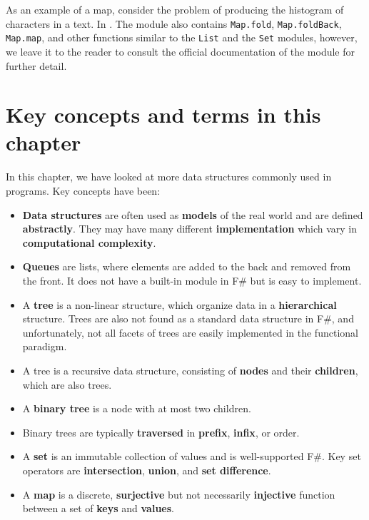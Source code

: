 \documentclass[fsharpNotes.tex]{subfiles}
\begin{document}
As an example of a map, consider the problem of producing the histogram of characters in a text. In .
%
%
The module also contains \lstinline{Map.fold}, \lstinline{Map.foldBack}, \lstinline{Map.map}, and other functions similar to the \lstinline{List} and the \lstinline{Set} modules, however, we leave it to the reader to consult the official documentation of the module for further detail.

\section{Key concepts and terms in this chapter}
In this chapter, we have looked at more data structures commonly used in programs. Key concepts have been:
\begin{itemize}
\item \textbf{Data structures} are often used as \textbf{models} of the real world and are defined \textbf{abstractly}. They may have many different \textbf{implementation} which vary in \textbf{computational complexity}. 
\item \textbf{Queues} are lists, where elements are added to the back and removed from the front. It does not have a built-in module in F\# but is easy to implement.
\item A \textbf{tree} is a non-linear structure, which organize data in a \textbf{hierarchical} structure. Trees are also not found as a standard data structure in F\#, and unfortunately, not all facets of trees are easily implemented in the functional paradigm.
\item A tree is a recursive data structure, consisting of \textbf{nodes} and their \textbf{children}, which are also trees. 
\item A \textbf{binary tree} is a node with at most two children.
\item Binary trees are typically \textbf{traversed} in \textbf{prefix}, \textbf{infix}, or  order.
\item A \textbf{set} is an immutable collection of values and is well-supported F\#. Key set operators are \textbf{intersection}, \textbf{union}, and \textbf{set difference}.
\item A \textbf{map} is a discrete, \textbf{surjective} but not necessarily \textbf{injective} function between a set of \textbf{keys} and \textbf{values}.
\end{itemize}
\end{document}

